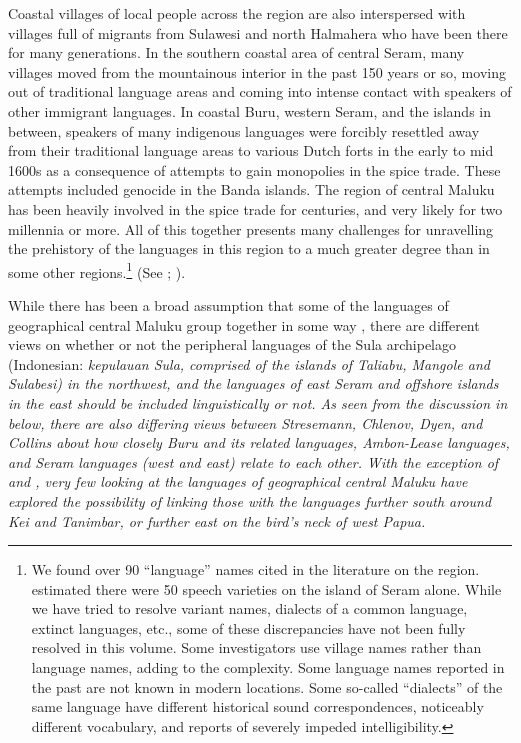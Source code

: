 Coastal villages of local people across the region are also interspersed
with villages full of migrants from Sulawesi
and north Halmahera who have been there for many generations.
In the southern coastal area of central Seram,
many villages moved from the mountainous interior in the past
150 years or so,
moving out of traditional language areas
and coming into intense contact with speakers of other immigrant languages.
In coastal Buru, western Seram,
and the islands in between,
speakers of many indigenous languages were forcibly resettled
away from their traditional language areas to various Dutch forts
in the early to mid 1600s as a consequence of attempts to gain
monopolies in the spice trade.
These attempts included genocide in the Banda islands.
The region of central Maluku has been heavily involved in the
spice trade for centuries,
and very likely for two millennia or more.
All of this together presents many challenges for unravelling
the prehistory of the languages in this region to a much greater
degree than in some other regions.\footnote{
		We found over 90
		“language” names cited in the literature on the region.
		\citet[1]{Stresemann1927} estimated there were 50 speech varieties
		on the island of Seram alone.
		While we have tried to resolve variant names,
		dialects of a common language,
		extinct languages, etc., some of these discrepancies have not
		been fully resolved in this volume.
		Some investigators use village names rather than language names,
		adding to the complexity.
		Some language names reported in the past are not known in modern locations.
		Some so-called “dialects” of the same language have different
		historical sound correspondences, noticeably different vocabulary, and reports of severely impeded
		intelligibility.}
(See ; 
\citealp{Collins1982c,Collins2003b,
Florey1991,Grimes1994,Grimes2010b,
MusgraveEwing2006}).

While there has been a broad assumption that some of the languages
of geographical central Maluku group together in some way \citep{Stresemann1927,
Dyen1965,Dyen1978a,Chlenov1976,Collins1981,
Collins1982c,Collins1983,Collins1986}, there are different views on whether or
not the peripheral languages of the Sula archipelago (Indonesian:
\it{kepulauan Sula}, comprised of the islands of Taliabu,
Mangole and Sulabesi) in the northwest,
and the languages of east Seram
and offshore islands  in the east should be included linguistically or not.
As seen from the discussion in  below,
there are also differing views between Stresemann,
Chlenov, Dyen, and Collins about how closely Buru
and its related languages,
Ambon-Lease languages, and Seram languages (west
and east) relate to each other.
With the exception of \citet{Chlenov1976}
and \citet{LoskiLoski1989}, very few looking at the languages
of geographical central Maluku have explored the possibility
of linking those with the languages further south around Kei
and Tanimbar, or further east on the bird’s neck of west Papua.

